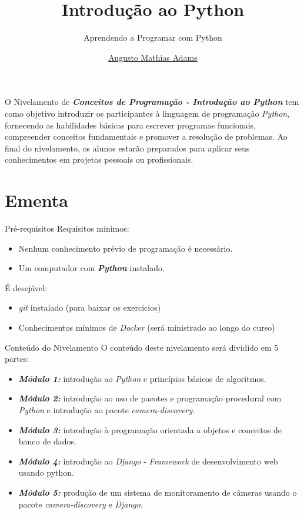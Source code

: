 \documentclass{beamer}
\title{Introdução ao Python}
\subtitle{Aprendendo a Programar com Python}
\author{\href{mailto:augusto.mathias@sesp.pr.gov.br}{Augusto Mathias Adams}}
\begin{document}
\maketitle
{}

\begin{frame}

O Nivelamento de \textbf{\textit{Conceitos de Programação - Introdução ao Python }}tem como objetivo introduzir os participantes à linguagem de programação \textit{Python}, fornecendo as habilidades básicas para escrever programas funcionais, compreender conceitos fundamentais e promover a resolução de problemas. Ao final do nivelamento, os alunos estarão preparados para aplicar seus conhecimentos em projetos pessoais ou profissionais.

\end{frame}

\section{Ementa}

\begin{frame}{Pré-requisitos}
	Requisitos mínimos:
	\begin{itemize}
		\item Nenhum conhecimento prévio de programação é necessário.
		\item Um computador com \textbf{\textit{Python}} instalado.
	\end{itemize}
	É desejável:
	\begin{itemize}
		\item \textit{git} instalado (para baixar os exercicios)
		\item Conhecimentos mínimos de \textit{Docker} (será ministrado ao longo do curso)
	\end{itemize}
\end{frame}



\begin{frame}{Conteúdo do Nivelamento}
	O conteúdo deste nivelamento será dividido em 5 partes:
	\begin{itemize}
		\item \textbf{\textit{Módulo 1: }} introdução ao \textit{Python} e princípios básicos de algoritmos.
		\item \textbf{\textit{Módulo 2: }} introdução ao uso de pacotes e programação procedural com \textit{Python} e introdução ao pacote \textit{camera-discovery}.
		\item \textbf{\textit{Módulo 3: }} introdução à programação orientada a objetos e conceitos de banco de dados.
		\item \textbf{\textit{Módulo 4: }} introdução ao \textit{Django} - \textit{Framework} de desenvolvimento web usando python.
		\item \textbf{\textit{Módulo 5: }} produção de um sistema de monitoramento de câmeras usando o pacote \textit{camera-discovery} e \textit{Django}.
	\end{itemize}
\end{frame}
\end{document}
